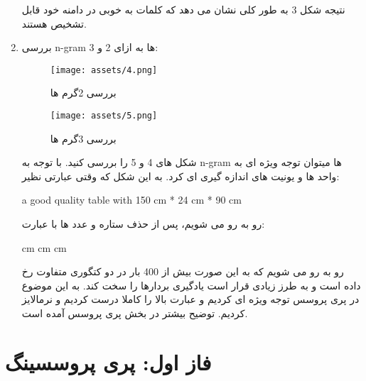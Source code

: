 \documentclass[a4paper,12pt]{article}
\begin{document}
\begin{enumerate}
نتیجه شکل 3 به طور کلی نشان می دهد که کلمات به خوبی در دامنه خود قابل تشخیص هستند.

	\item 
	
	بررسی n-gram ها به ازای 2 و 3:
	\begin{figure}[H]
		\centering
		\texttt{[image: assets/4.png]}
		\caption{\textcolor{CustomAccent}{بررسی 2گرم ها}}
	\end{figure}
	
	
	\begin{figure}[H]
		\centering
		\texttt{[image: assets/5.png]}
		\caption{\textcolor{CustomAccent}{بررسی 3گرم ها}}
	\end{figure}

شکل های 4 و 5 را بررسی کنید. با توجه به n-gram ها میتوان توجه ویژه ای به واحد ها و یونیت های اندازه گیری ای کرد. به این شکل که وقتی عبارتی نظیر:
\begin{latin}
	a good quality table with 150 cm * 24 cm * 90 cm
\end{latin}
رو به رو می شویم، پس از حذف ستاره و عدد ها با عبارت:
\begin{latin}
	cm cm cm 
\end{latin}
رو به رو می شویم که به این صورت بیش از 400 بار در دو کتگوری متفاوت رخ داده است و به طرز زیادی قرار است یادگیری بردارها را سخت کند. به این موضوع در پری پروسس توجه ویژه ای کردیم و عبارت بالا را کاملا درست کردیم و نرمالایز کردیم. توضیح بیشتر در بخش پری پروسس آمده است.

\end{enumerate}

\pagebreak

\section{فاز اول: پری پروسسینگ}
\end{document}
